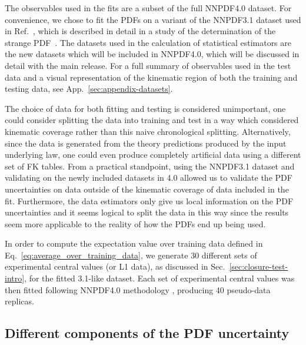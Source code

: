 The observables used in the fits are a subset of the full NNPDF4.0 dataset. For
convenience, we chose to fit the PDFs on a variant of the NNPDF3.1 dataset used
in Ref.~\cite{Ball_2018}, which is described in detail in a study of the
determination of the strange PDF~\cite{Faura_2020}. 
The datasets used in the
calculation of statistical estimators are the new datasets which will be
included in NNPDF4.0, which will be discussed in detail with the main release.
For a full summary of observables used in the test data and a visual
representation of the kinematic region of both the training and testing data,
see App.~\ref{sec:appendix-datasets}.

The choice of data for both fitting and testing is considered unimportant, one
could consider splitting the data into training and test in a way which
considered kinematic coverage rather than this naive chronological splitting.
Alternatively, since the data is generated from the theory predictions produced
by the input underlying law, one could even produce completely artificial data
using a different set of FK tables. From a practical standpoint, using the
NNPDF3.1 dataset and validating on the newly included datasets in 4.0 allowed us
to validate the PDF uncertainties on data outside of the kinematic coverage of
data included in the fit. Furthermore, the data estimators only give us local
information on the PDF uncertainties and it seems logical to split the data in
this way since the results seem more applicable to the reality of how the PDFs
end up being used.

In order to compute the expectation value over training data defined in Eq.~\ref{eq:average_over_training_data},
we generate 30 different sets of experimental central values (or L1 data),
as discussed in Sec.~\ref{sec:closure-test-intro}, for the fitted 3.1-like
dataset. Each set of experimental central values was then fitted following
NNPDF4.0 methodology \cite{NNPDF40}, producing 40 pseudo-data replicas.


\subsection{Different components of the PDF uncertainty}

